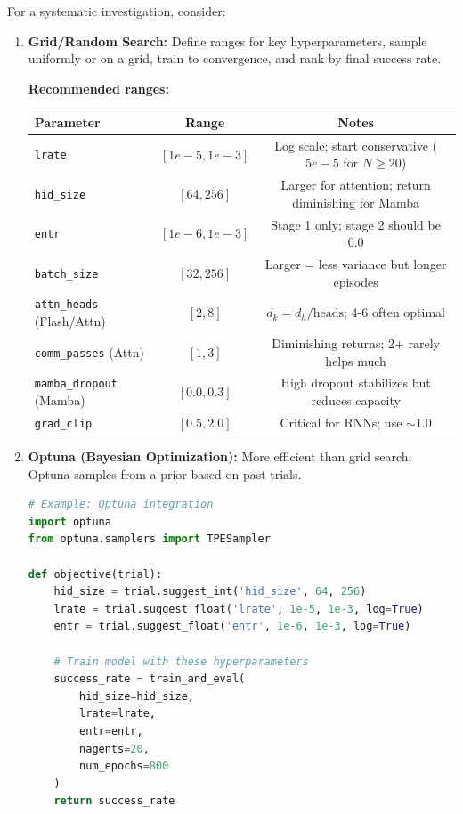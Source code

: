 For a systematic investigation, consider:

\begin{enumerate}
    \item \textbf{Grid/Random Search:} Define ranges for key hyperparameters, sample uniformly or on a grid, train to convergence, and rank by final success rate.
    
    \textbf{Recommended ranges:}
    \begin{table}[h]
    \centering
    \begin{tabular}{|l|c|c|}
    \hline
    \textbf{Parameter} & \textbf{Range} & \textbf{Notes} \\
    \hline
    \texttt{lrate} & $[1e-5, 1e-3]$ & Log scale; start conservative ($5e-5$ for $N \geq 20$) \\
    \texttt{hid\_size} & $[64, 256]$ & Larger for attention; return diminishing for Mamba \\
    \texttt{entr} & $[1e-6, 1e-3]$ & Stage 1 only; stage 2 should be 0.0 \\
    \texttt{batch\_size} & $[32, 256]$ & Larger = less variance but longer episodes \\
    \texttt{attn\_heads} (Flash/Attn) & $[2, 8]$ & $d_k = d_h / \text{heads}$; 4-6 often optimal \\
    \texttt{comm\_passes} (Attn) & $[1, 3]$ & Diminishing returns; 2+ rarely helps much \\
    \texttt{mamba\_dropout} (Mamba) & $[0.0, 0.3]$ & High dropout stabilizes but reduces capacity \\
    \texttt{grad\_clip} & $[0.5, 2.0]$ & Critical for RNNs; use $\sim 1.0$ \\
    \hline
    \end{tabular}
    \end{table}
    
    \item \textbf{Optuna (Bayesian Optimization):} More efficient than grid search; Optuna samples from a prior based on past trials.
    
    \begin{lstlisting}[language=Python, basicstyle=\small]
# Example: Optuna integration
import optuna
from optuna.samplers import TPESampler

def objective(trial):
    hid_size = trial.suggest_int('hid_size', 64, 256)
    lrate = trial.suggest_float('lrate', 1e-5, 1e-3, log=True)
    entr = trial.suggest_float('entr', 1e-6, 1e-3, log=True)
    
    # Train model with these hyperparameters
    success_rate = train_and_eval(
        hid_size=hid_size,
        lrate=lrate,
        entr=entr,
        nagents=20,
        num_epochs=800
    )
    return success_rate


\end{lstlisting}
\end{enumerate}
